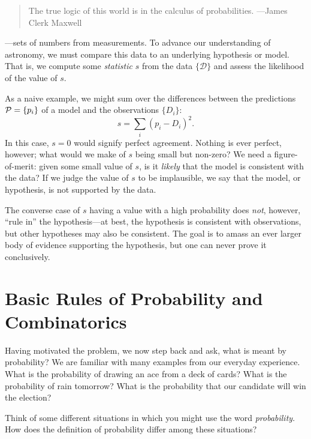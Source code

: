 
\begin{quote}The true logic of this world is  in the calculus of probabilities. ---James Clerk Maxwell\end{quote}

---sets of numbers from measurements. To advance our understanding of astronomy, we must compare this data to an underlying hypothesis or model.  That is, we compute some \emph{statistic} $s$ from the data $\{\mathcal{D}\}$ and assess the likelihood of the value of $s$.

As a naive example, we might sum over the differences between the predictions $\mathcal{P} = \{p_{i}\}$ of a model and the observations $\{D_{i}\}$:
\[ s = \sum_{i} \left(p_{i}-D_{i}\right)^{2}. \]
In this case, $s=0$ would signify perfect agreement. Nothing is ever perfect, however; what would we make of $s$ being small but non-zero?  We need a figure-of-merit: given some small value of $s$, is it \emph{likely} that the model is consistent with the data?  If we judge the value of $s$ to be implausible, we say that the model, or hypothesis, is not supported by the data.  

The converse case of $s$ having a value with a high probability does \emph{not}, however, ``rule in'' the hypothesis---at best, the hypothesis is consistent with observations, but other hypotheses may also be consistent. The goal is to amass an ever larger body of evidence supporting the hypothesis, but one can never prove it conclusively.

\section{Basic Rules of Probability and Combinatorics}

Having motivated the problem, we now step back and ask, what is meant by probability? We are familiar with many examples from our everyday experience. What is the probability of drawing an ace from a deck of cards? What is the probability of rain tomorrow? What is the probability that our candidate will win the election?

\newpage
\begin{exercisebox}
Think of some different situations in which you might use the word \emph{probability}.  How does the definition of probability differ among these situations?
\end{exercisebox}

